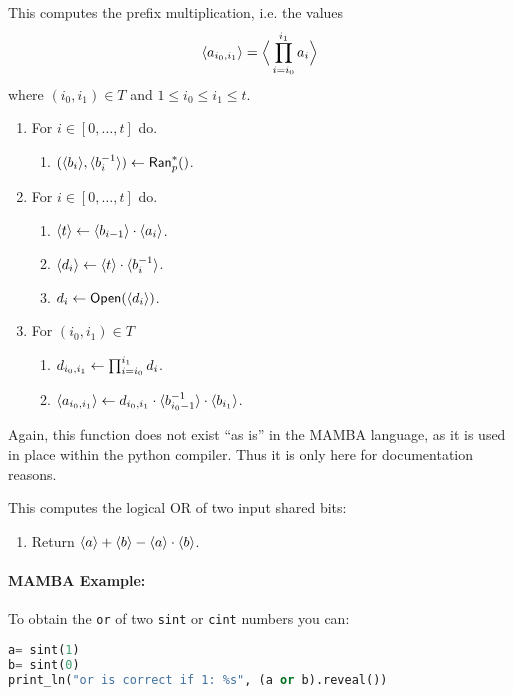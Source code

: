 This computes the prefix multiplication, i.e. the values 
\[ \langle a_{i_0,i_1} \rangle = \Big\langle \prod_{i=i_0}^{i_1} a_i \Big\rangle \]
where $(i_0,i_1) \in T$ and $1 \le i_0 \le i_1 \le t$.
\begin{enumerate}
\item For $i \in [0,\ldots,t]$ do.
\begin{enumerate}
  \item $(\langle b_i \rangle,\langle b_i^{-1} \rangle) \leftarrow \mathsf{Ran}_p^*()$.
\end{enumerate}
\item For $i \in [0,\ldots,t]$ do.
\begin{enumerate}
  \item $\langle t \rangle \leftarrow \langle b_{i-1} \rangle \cdot \langle a_i \rangle$.
  \item $\langle d_i \rangle \leftarrow \langle t \rangle \cdot \langle b_i^{-1} \rangle$.
  \item $d_i \leftarrow {\mathsf{Open}}(\langle d_i \rangle)$.
\end{enumerate}
\item For $(i_0,i_1) \in T$ 
\begin{enumerate}
   \item $d_{i_0,i_1} \leftarrow \prod_{i=i_0}^{i_1} d_i$.
   \item $\langle a_{i_0,i_1} \rangle \leftarrow d_{i_0,i_1} \cdot
	   	\langle b_{i_0-1}^{-1} \rangle \cdot \langle b_{i_1} \rangle$.
\end{enumerate}
\end{enumerate}
Again, this function does not exist ``as is'' in the MAMBA language, as it
is used in place within the python compiler. Thus it is only here
for documentation reasons.




This computes the logical OR of two input shared bits:
\begin{enumerate}
\item Return $\langle a \rangle+\langle b \rangle-\langle a \rangle \cdot \langle b \rangle$.
\end{enumerate}
\paragraph{MAMBA Example:} To obtain the \verb|or| of two \verb|sint| or \verb|cint| numbers you can: 
\begin{lstlisting}[language={python}]
a= sint(1)
b= sint(0)
print_ln("or is correct if 1: %s", (a or b).reveal())
\end{lstlisting}

